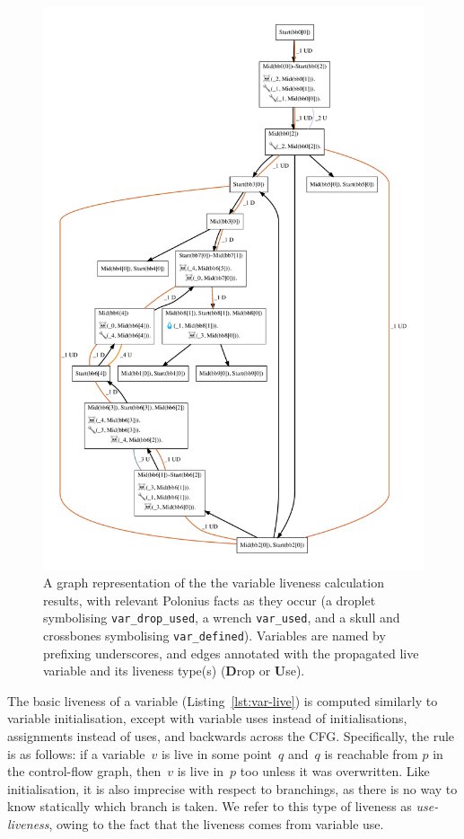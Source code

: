 \documentclass[11pt,a4paper,twoside,openany]{report}
\newcommand{\InDatalog}[1]{\texttt{#1}}
\begin{document}
\begin{figure}
  \includegraphics[width=0.9\linewidth]{Graphs/liveness.pdf}
  \caption[MIR Fragment with Inputs and Outputs of the Liveness Analysis]{A
    graph representation of the the variable liveness calculation results, with
    relevant Polonius facts as they occur (a droplet symbolising
    \InDatalog{var_drop_used}, a wrench \InDatalog{var_used}, and a skull and
    crossbones symbolising \InDatalog{var_defined}). Variables are named by
    prefixing underscores, and edges annotated with the propagated live variable
    and its liveness type(s) (\textbf{D}rop or \textbf{U}se).}
  \label{fig:liveness-graph}
\end{figure}

The basic liveness of a variable (Listing~\ref{lst:var-live}) is computed
similarly to variable initialisation, except with variable uses instead of
initialisations, assignments instead of uses, and backwards across the CFG.
Specifically, the rule is as follows: if a variable~$v$ is live in some
point~$q$ and~$q$ is reachable from $p$ in the control-flow graph, then~$v$ is
live in~$p$ too unless it was overwritten. Like initialisation, it is also
imprecise with respect to branchings, as there is no way to know statically
which branch is taken. We refer to this type of liveness as
\textit{use-liveness}, owing to the fact that the liveness comes from variable
use.
\end{document}
